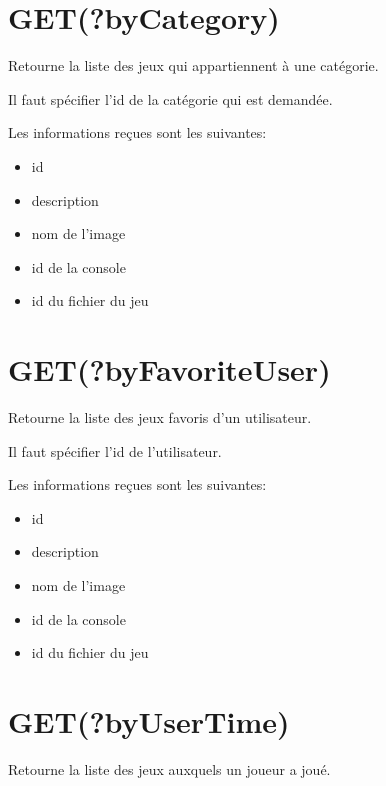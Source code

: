 \documentclass[a4paper,12pt,french]{sphinxmanual}
\begin{document}
\section{GET(?byCategory)}
\label{\detokenize{fonctionnelleAPI:get-bycategory}}
\sphinxAtStartPar
Retourne la liste des jeux qui appartiennent à une catégorie.

\sphinxAtStartPar
Il faut spécifier l’id de la catégorie qui est demandée.

\sphinxAtStartPar
Les informations reçues sont les suivantes:
\begin{itemize}
\item {} 
\sphinxAtStartPar
id

\item {} 
\sphinxAtStartPar
description

\item {} 
\sphinxAtStartPar
nom de l’image

\item {} 
\sphinxAtStartPar
id de la console

\item {} 
\sphinxAtStartPar
id du fichier du jeu

\end{itemize}


\section{GET(?byFavoriteUser)}
\label{\detokenize{fonctionnelleAPI:get-byfavoriteuser}}
\sphinxAtStartPar
Retourne la liste des jeux favoris d’un utilisateur.

\sphinxAtStartPar
Il faut spécifier l’id de l’utilisateur.

\sphinxAtStartPar
Les informations reçues sont les suivantes:
\begin{itemize}
\item {} 
\sphinxAtStartPar
id

\item {} 
\sphinxAtStartPar
description

\item {} 
\sphinxAtStartPar
nom de l’image

\item {} 
\sphinxAtStartPar
id de la console

\item {} 
\sphinxAtStartPar
id du fichier du jeu

\end{itemize}


\section{GET(?byUserTime)}
\label{\detokenize{fonctionnelleAPI:get-byusertime}}
\sphinxAtStartPar
Retourne la liste des jeux auxquels un joueur a joué.
\end{document}

